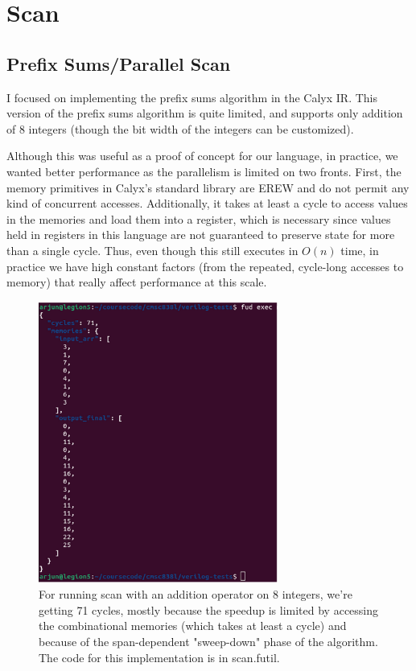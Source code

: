 \documentclass[12pt]{article}
\begin{document}
\section{Scan}
\subsection{Prefix Sums/Parallel Scan}
I focused on implementing the prefix sums algorithm\cite{blelloch_prefix_1990} in the Calyx IR. This version of the prefix
sums algorithm is quite limited, and supports only addition of 8 integers (though the bit width of the integers
can be customized).

Although this was useful as a proof of concept for our language, in practice, we wanted better performance as the parallelism
is limited on two fronts. First, the memory primitives in Calyx's standard library are EREW and do not permit
any kind of concurrent accesses. Additionally, it takes at least a cycle to access values in the memories and load
them into a register, which is necessary since values held in registers in this language are not guaranteed
to preserve state for more than a single cycle. Thus, even though this still executes in $O(n)$ time,
in practice we have high constant factors (from the repeated, cycle-long accesses to memory) that really affect performance at this scale.

\begin{figure}[H]
    \centering
    \includegraphics[height=25em]{images/prefix_sums.png}
    \caption{For running scan with an addition operator on 8 integers, we're getting 71 cycles, mostly because the speedup
    is limited by accessing the combinational memories (which takes at least a cycle) and because
    of the span-dependent "sweep-down" phase of the algorithm. The code for this implementation is in scan.futil.}
\end{figure}
\end{document}
